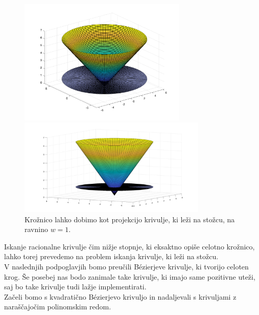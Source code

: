 \documentclass[a4paper,11pt]{article}
\theoremstyle{definition}
\theoremstyle{plain}
\begin{document}
\begin{figure}[ht!]
    \begin{minipage}{0.5\textwidth}
        \centering
        \includegraphics[width=80mm]{stozec.png}
    \end{minipage}\hfill
    \begin{minipage}{0.5\textwidth}
        \centering
        \includegraphics[width=90mm]{stozec_od_strani.png}
    \end{minipage}\hfill
    \caption{Krožnico lahko dobimo kot projekcijo krivulje, ki leži na stožcu, na ravnino $w = 1$.}
\end{figure}
\noindent
Iskanje racionalne krivulje čim nižje stopnje, ki eksaktno opiše celotno krožnico, lahko torej prevedemo na problem iskanja krivulje, ki leži na stožcu. 
\\
V naslednjih podpoglavjih bomo preučili B\'ezierjeve krivulje, ki tvorijo celoten krog. 
Še posebej nas bodo zanimale take krivulje, ki imajo same pozitivne uteži, saj bo take krivulje tudi lažje implementirati.
\\
Začeli bomo s kvadratično B\'ezierjevo krivuljo in nadaljevali s krivuljami z naraščajočim polinomskim redom.
\end{document}
